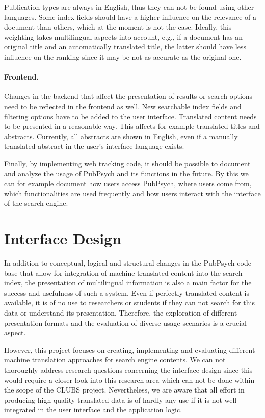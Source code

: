 \documentclass[a4paper,11pt]{article}
\begin{document}
Publication types are always in English, thus they can not be found using other languages. Some index fields should have a higher influence on the relevance of a document than others, which at the moment is not the case. Ideally, this weighting takes multilingual aspects into account, e.g., if a document has an original title and an automatically translated title, the latter should have less influence on the ranking since it may be not as accurate as the original one.

\paragraph{Frontend.}
Changes in the backend that affect the presentation of results or search options need to be reflected in the frontend as well. New searchable index fields and filtering options have to be added to the user interface. Translated content needs to be presented in a reasonable way. This affects for example translated titles and abstracts. Currently, all abstracts are shown in English, even if a manually translated abstract in the user's interface language exists.

Finally, by implementing web tracking code, it should be possible to document and analyze the usage of PubPsych and its functions in the future. By this we can for example document how users access PubPsych, where users come from, which functionalities are used frequently and how users interact with the interface of the search engine.

\section{Interface Design}
\label{s:interface_design}

In addition to conceptual, logical and structural changes in the PubPsych code base that allow for integration of machine translated content into the search index, the presentation of multilingual information is also a main factor for the success and usefulness of such a system. Even if perfectly translated content is available, it is of no use to researchers or students if they can not search for this data or understand its presentation. Therefore, the exploration of different presentation formats and the evaluation of diverse usage scenarios is a crucial aspect.

However, this project focuses on creating, implementing and evaluating different machine translation approaches for search engine contents. We can not thoroughly address research questions concerning the interface design since this would require a closer look into this research area which can not be done within the scope of the CLUBS project. Nevertheless, we are aware that all effort in producing high quality translated data is of hardly any use if it is not well integrated in the user interface and the application logic.
\end{document}
